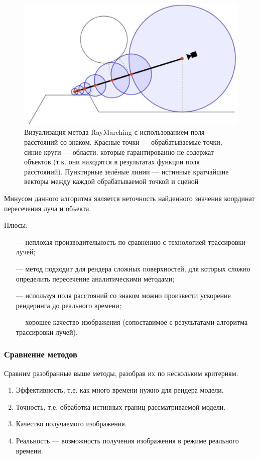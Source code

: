 \begin{figure}[h]
	\centering
	\captionsetup{justification=centering}
	\includegraphics[width=120mm]{img/raymarchingsdf.png}
	\caption{Визуализация метода RayMarching с использованием поля расстояний со знаком. Красные точки — обрабатываемые точки, синие круги --- области, которые гарантированно не содержат объектов (т.к. они находятся в результатах функции поля расстояний). Пунктирные зелёные линии --- истинные кратчайшие векторы между каждой обрабатываемой точкой и сценой}
	\label{fig:raymarchingsdf}
\end{figure}

Минусом данного алгоритма является неточность найденного значения координат пересечения луча и объекта.

Плюсы:
\begin{itemize}[leftmargin=1.6\parindent]
	\item[---] неплохая производительность по сравнению с технологией трассировки лучей;
	\item[---] метод подходит для рендера сложных поверхностей, для которых 
	сложно определить пересечение аналитическими методами;
	\item[---] используя поля расстояний со знаком можно произвести ускорение 
	рендеринга до реального времени;
	\item[---] хорошее качество изображения (сопоставимое с результатами алгоритма трассировки лучей).
\end{itemize}
\clearpage

\subsubsection{Сравнение методов}

Сравним разобранные выше методы, разобрав их по нескольким 
критериям.
\begin{enumerate}[leftmargin=1.6\parindent,label=\arabic*.]
	\item Эффективность, т.е. как много времени нужно для рендера модели.
	\item Точность, т.е. обработка истинных границ рассматриваемой модели.
	\item Качество получаемого изображения.
	\item Реальность — возможность получения изображения в режиме 
	реального времени.
\end{enumerate}

